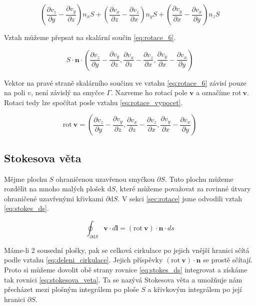 \documentclass{book}
\newcommand{\vect}[1]{\boldsymbol{#1}}
\newcommand{\rot}{\mathrm{rot}}
\begin{document}
\begin{equation}
\label{eq:rotace_5}
\left( \frac{\partial v_z}{\partial y} - \frac{\partial v_y}{\partial z} \right) n_x S + \left( \frac{\partial v_x}{\partial z} - \frac{\partial v_z}{\partial x} \right) n_y S + \left( \frac{\partial v_y}{\partial x} - \frac{\partial v_x}{\partial y} \right) n_z S 
\end{equation}

Vztah můžeme přepsat na skalární součin \eqref{eq:rotace_6}.

\begin{equation}
\label{eq:rotace_6}
S \cdot \vect{n} \cdot \left(\frac{\partial v_z}{\partial y} - \frac{\partial v_y}{\partial z}, \frac{\partial v_x}{\partial z} - \frac{\partial v_z}{\partial x}, \frac{\partial v_y}{\partial x} - \frac{\partial v_x}{\partial y} \right)
\end{equation}

Vektor na pravé straně skalárního součinu ve vztahu \eqref{eq:rotace_6} závisí pouze na poli \(v\), není závislý na smyčce \(\Gamma\). Nazveme ho rotací pole \(\vect{v}\) a označíme \(\rot \ \vect{v}\). Rotaci tedy lze spočítat posle vztahu \eqref{eq:rotace_vypocet}.

\begin{equation}
\label{eq:rotace_vypocet}
\rot \ \vect{v} = \left(\frac{\partial v_z}{\partial y} - \frac{\partial v_y}{\partial z}, \frac{\partial v_x}{\partial z} - \frac{\partial v_z}{\partial x}, \frac{\partial v_y}{\partial x} - \frac{\partial v_x}{\partial y} \right)
\end{equation}


\subsection{Stokesova věta}

Mějme plochu \(S\) ohraničenou uzavřenou smyčkou \(\partial S\). Tuto plochu můžeme rozdělit na mnoho malých plošek \(\mathrm{d}S\), které můžeme považovat za rovinné útvary ohraničené uzavřenými křivkami \(\partial \mathrm{d}S\). V sekci \ref{sec:rotace} jsme odvodili vztah \eqref{eq:stokes_ds}.

\begin{equation}
\label{eq:stokes_ds}
\oint_{\partial \mathrm{d}S} \vect{v} \cdot d\vect{l} = (\rot \ \vect{v}) \cdot \vect{n} \cdot ds
\end{equation}

Máme-li 2 sousední plošky, pak se celková cirkulace po jejich vnější hranici sčítá podle vztahu \eqref{eq:deleni_cirkulace}. Jejich příspěvky \((\rot \ \vect{v}) \cdot \vect{n}\) se prostě sčítají. Proto si můžeme dovolit obě strany rovnice \eqref{eq:stokes_ds} integrovat a získáme tak rovnici \eqref{eq:stokesova_veta}. Ta se nazývá Stokesova věta a umožňuje nám přecházet mezi plošným integrálem po ploše \(S\) a křivkovým integrálem po její hranici \(\partial S\).
\end{document}
